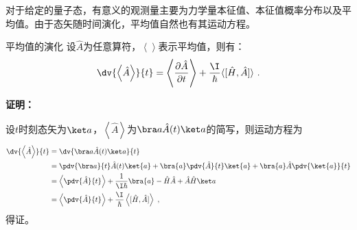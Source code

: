 

对于给定的量子态，有意义的观测量主要为力学量本征值、本征值概率分布以及平均值。由于态矢随时间演化，平均值自然也有其运动方程。
\begin{theorem}{平均值的演化}
设$\hat A$为任意算符，$\left\langle\right\rangle$表示平均值，则有：
\begin{equation}
\dv{\left\langle \hat A \right\rangle}{t}=\left\langle\frac{\partial \hat A}{\partial t}\right\rangle+\frac{\I}{\hbar}\langle[\hat H, \hat A]\rangle~.
\end{equation}
\end{theorem}

\textbf{证明：}

设$t$时刻态矢为$\ket a$，$\left\langle \hat A\right\rangle$为$\bra a \hat A(t)\ket a$的简写，则运动方程为
\begin{equation}
\begin{aligned}
\dv{\left\langle \hat A \right\rangle}{t}&=\dv{\bra a \hat A(t)\ket a}{t}\\
&=\pdv{\bra a}{t}\hat A(t)\ket{a}+\bra{a}\pdv{\hat A}{t}\ket{a}+\bra{a}\hat A\pdv{\ket{a}}{t}\\
&=\left\langle \pdv{\hat A}{t}\right\rangle+\frac{1}{\I\hbar}\bra{a}-\hat H\hat A+\hat A\hat H\ket a\\
&=\left\langle \pdv{\hat A}{t}\right\rangle+\frac{\I}{\hbar}\left\langle [\hat H,\hat A]\right\rangle~,
\end{aligned}
\end{equation}
得证。


